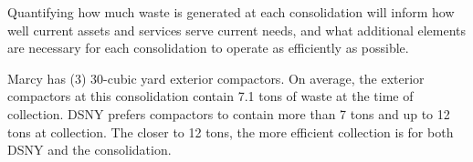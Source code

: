 
    Quantifying how much waste is generated at each consolidation will inform how well current assets and services serve current needs, and what additional elements are necessary for each consolidation to operate as efficiently as possible.
    
    Marcy has (3) 30-cubic yard exterior compactors. On average, the exterior compactors at this consolidation contain 7.1 tons of waste at the time of collection. DSNY prefers compactors to contain more than 7 tons and up to 12 tons at collection. The closer to 12 tons, the more efficient collection is for both DSNY and the consolidation.